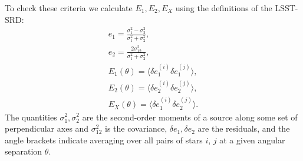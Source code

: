 \documentclass[a4paper,fleqn,usenatbib]{mnras}
\begin{document}
To check these criteria we calculate $E_{1}, E_{2}, E_{X}$ using the definitions of the LSST-SRD:
\begin{eqnarray}
e_{1} = \frac{\sigma^{2}_{1} - \sigma^{2}_{2}}{\sigma_{1}^{2}+\sigma_{2}^{2}},\\
e_{2} = \frac{2\sigma^{2}_{12}}{\sigma_{1}^{2}+\sigma_{2}^{2}},\\
E_{1} (\theta) = \langle \delta e^{(i)}_{1}\delta e^{(j)}_{1} \rangle,\\
E_{2} (\theta) = \langle \delta e^{(i)}_{2}\delta e^{(j)}_{2} \rangle,\\
E_{X} (\theta) = \langle \delta e^{(i)}_{1}\delta e^{(j)}_{2} \rangle.
\end{eqnarray}
The quantities $\sigma_{1}^{2}, \sigma_{2}^{2}$ are the second-order moments of a source along some set of perpendicular axes and $\sigma^{2}_{12}$ is the covariance, $\delta e_{1}, \delta e_{2}$ are the residuals, and the angle brackets indicate averaging over all pairs of stars $i$, $j$ at a given angular separation $\theta$.
\end{document}
